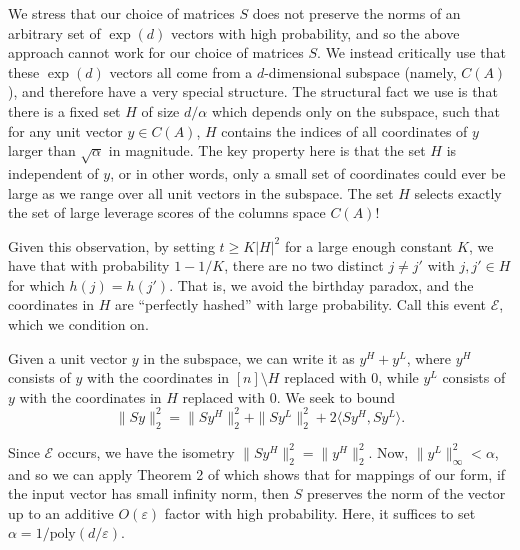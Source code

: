\documentclass{sig-alternate}
\newcommand{\cE}{\mathcal{E}}
\newcommand{\poly}{{\mathrm{poly}}}
\newcommand{\eps}{\varepsilon}
\begin{document}
We stress that our choice of matrices $S$ does not preserve the norms of 
an arbitrary
set of $\exp(d)$ vectors with high probability, and so
the above approach cannot work for our choice of matrices $S$.
We instead critically use that these $\exp(d)$ vectors all come
from a $d$-dimensional subspace (namely, $C(A)$), and
therefore have a very special structure.
The structural fact we use is that there is a fixed set $H$ of size $d/\alpha$ which depends only on the
subspace, such that for any unit vector $y\in C(A)$, $H$ contains the indices
of all coordinates of $y$ larger than $\sqrt{\alpha}$ in magnitude.
The key property here is that the set $H$
is independent of $y$, or in other words, only a small set of coordinates could ever be large
as we range over all unit vectors in the subspace.
The set $H$ selects exactly the set of large leverage scores of the columns space $C(A)$!


Given this observation, by setting $t \geq K |H|^2$ for a large enough constant $K$, we have that with probability $1-1/K$, there are no
two distinct $j \neq j'$ with $j, j' \in H$ for which $h(j) = h(j')$. That is, we avoid the birthday paradox,
and the coordinates in $H$ are ``perfectly hashed'' with large
probability. Call this event $\cE$, which we condition on. 

Given a unit vector $y$ in the subspace, we can write it as $y^H + y^L$, where $y^H$ consists of $y$ with
the coordinates in $[n] \setminus H$ replaced with $0$, while $y^L$ consists of $y$ with the coordinates in $H$ replaced with $0$. We seek
to bound $$\|Sy\|_2^2 = \|Sy^H\|_2^2 + \|Sy^L\|_2^2 + 2\langle Sy^H, Sy^L \rangle.$$

Since $\cE$ occurs,
we have the isometry $\|Sy^H\|_2^2 = \|y^H\|_2^2$. Now, $\|y^L\|^2_{\infty} < \alpha $, and so we can apply Theorem 2 of 
\cite{dks10} which shows that for mappings of our form, if the input vector has small infinity norm, then $S$ preserves the norm of the
vector up to an additive $O(\eps)$ factor with high probability. Here, it suffices to set $\alpha = 1/\poly(d/\eps)$. 
\end{document}
